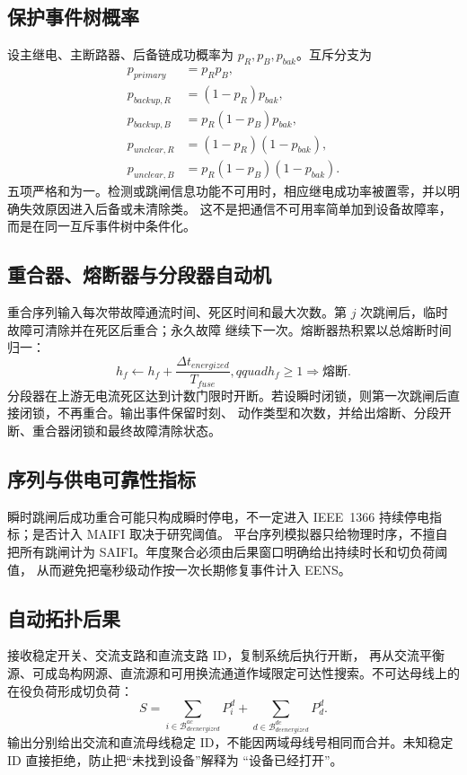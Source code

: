 \subsection{保护事件树概率}
设主继电、主断路器、后备链成功概率为 $p_R,p_B,p_{bak}$。互斥分支为
\begin{align}
 p_{primary}&=p_Rp_B,\\
 p_{backup,R}&=(1-p_R)p_{bak},\\
 p_{backup,B}&=p_R(1-p_B)p_{bak},\\
 p_{unclear,R}&=(1-p_R)(1-p_{bak}),\\
 p_{unclear,B}&=p_R(1-p_B)(1-p_{bak}).
\end{align}
五项严格和为一。检测或跳闸信息功能不可用时，相应继电成功率被置零，并以明确失效原因进入后备或未清除类。
这不是把通信不可用率简单加到设备故障率，而是在同一互斥事件树中条件化。

\subsection{重合器、熔断器与分段器自动机}
重合序列输入每次带故障通流时间、死区时间和最大次数。第 $j$ 次跳闸后，临时故障可清除并在死区后重合；永久故障
继续下一次。熔断器热积累以总熔断时间归一：
\begin{equation}
 h_f\leftarrow h_f+\frac{\Delta t_{energized}}{T_{fuse}},qquad h_f\ge1\Rightarrow\text{熔断}.
\end{equation}
分段器在上游无电流死区达到计数门限时开断。若设瞬时闭锁，则第一次跳闸后直接闭锁，不再重合。输出事件保留时刻、
动作类型和次数，并给出熔断、分段开断、重合器闭锁和最终故障清除状态。

\subsection{序列与供电可靠性指标}
瞬时跳闸后成功重合可能只构成瞬时停电，不一定进入 IEEE~1366 持续停电指标；是否计入 MAIFI 取决于研究阈值。
平台序列模拟器只给物理时序，不擅自把所有跳闸计为 SAIFI。年度聚合必须由后果窗口明确给出持续时长和切负荷阈值，
从而避免把毫秒级动作按一次长期修复事件计入 EENS。

\subsection{自动拓扑后果}
 接收稳定开关、交流支路和直流支路 ID，复制系统后执行开断，
再从交流平衡源、可成岛构网源、直流源和可用换流通道作域限定可达性搜索。不可达母线上的在役负荷形成切负荷：
\begin{equation}
 S=\sum_{i\in\mathcal B_{deenergized}^{ac}}P_i^d+
 \sum_{d\in\mathcal B_{deenergized}^{dc}}P_d^d.
\end{equation}
输出分别给出交流和直流母线稳定 ID，不能因两域母线号相同而合并。未知稳定 ID 直接拒绝，防止把“未找到设备”解释为
“设备已经打开”。


